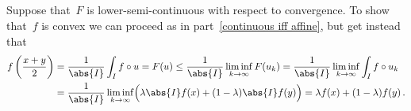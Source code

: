 \subsection{}

Suppose that~$F$ is lower-semi-continuous with respect to {\weakstar} convergence.
To show that~$f$ is convex we can proceed as in part~\ref{continuous iff affine}, but get instead that
\begin{align*}
  f\left( \frac{x + y}{2} \right)
  &=
  \frac{1}{\abs{I}} \int_I f \circ u
  =
  F(u)
  \leq
  \frac{1}{\abs{I}} \liminf_{k \to \infty} F(u_k)
  =
  \frac{1}{\abs{I}} \liminf_{k \to \infty} \int_I f \circ u_k
  \\
  &=
  \frac{1}{\abs{I}}
  \liminf_{k \to \infty} \Bigl( \lambda \abs{I} f(x) + (1 - \lambda) \abs{I} f(y) \Bigr)
  =
  \lambda f(x) + (1 - \lambda) f(y) \,.
\end{align*}































